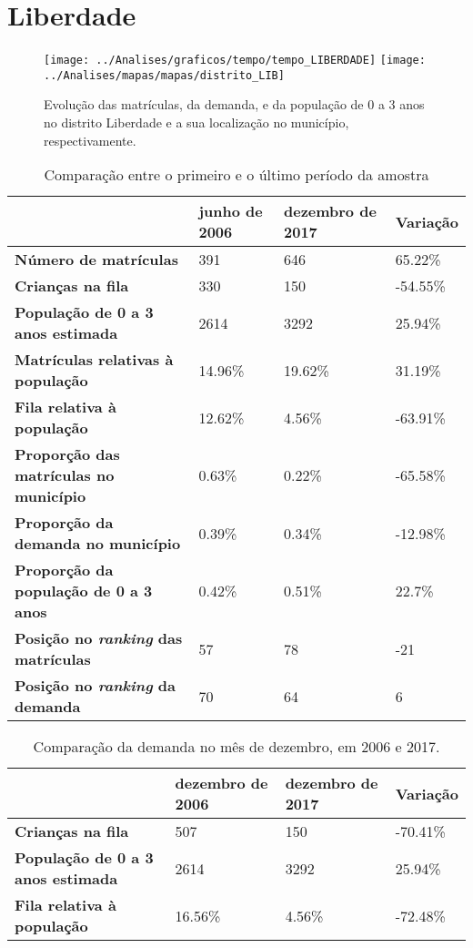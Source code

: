 \section{Liberdade}
\begin{figure}[H]
\centering
\texttt{[image: ../Analises/graficos/tempo/tempo\_LIBERDADE]}
\texttt{[image: ../Analises/mapas/mapas/distrito\_LIB]}
\caption{Evolução das matrículas, da demanda, e da população de 0 a 3 anos no distrito Liberdade e a sua localização no município, respectivamente.}
\end{figure}
\begin{table}[H]
\begin{tabular}{l|l|l|l}
\textbf{}                                      & \textbf{junho de 2006}       & \textbf{dezembro de 2017}    & \textbf{Variação} \\ \hline
\textbf{Número de matrículas}                  & 391 & 646 & 65.22\% \\ \hline
\textbf{Crianças na fila}                      & 330 & 150 & -54.55\% \\ \hline
\textbf{População de 0 a 3 anos estimada}      & 2614 & 3292 & 25.94\% \\ \hline
\textbf{Matrículas relativas à população}      & 14.96\% & 19.62\% & 31.19\% \\ \hline
\textbf{Fila relativa à população}             & 12.62\% & 4.56\% & -63.91\% \\ \hline
\textbf{Proporção das matrículas no município} & 0.63\% & 0.22\% & -65.58\% \\ \hline
\textbf{Proporção da demanda no município}     & 0.39\% & 0.34\% & -12.98\% \\ \hline
\textbf{Proporção da população de 0 a 3 anos}  & 0.42\% & 0.51\% & 22.7\% \\ \hline
\textbf{Posição no \textit{ranking} das matrículas}     & 57 & 78 & -21 \\ \hline
\textbf{Posição no \textit{ranking} da demanda}         & 70 & 64 & 6 \\ 
\end{tabular}
\caption{Comparação entre o primeiro e o último período da amostra}
\end{table}
\begin{table}[H]
\begin{tabular}{l|l|l|l}
\textbf{}                                 & \textbf{dezembro de 2006} & \textbf{dezembro de 2017} & \textbf{Variação} \\ \hline
\textbf{Crianças na fila}                      & 507 & 150 & -70.41\% \\ \hline
\textbf{População de 0 a 3 anos estimada}      & 2614 & 3292 & 25.94\% \\ \hline
\textbf{Fila relativa à população}             & 16.56\% & 4.56\% & -72.48\% \\
\end{tabular}
\caption{Comparação da demanda no mês de dezembro, em 2006 e 2017.}
\end{table}
